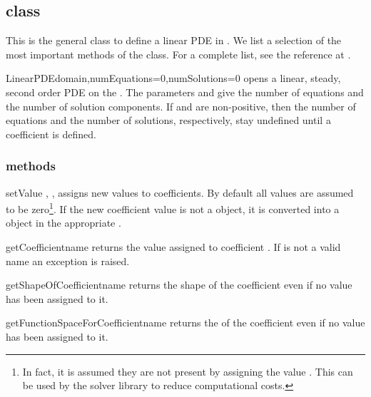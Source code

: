 \subsection{\LinearPDE class}
This is the general class to define a linear PDE in \escript.
We list a selection of the most important methods of the class.
For a complete list, see the reference at \ReferenceGuide.

\begin{classdesc}{LinearPDE}{domain,numEquations=0,numSolutions=0}
opens a linear, steady, second order PDE on the \Domain {}.
The parameters  and  give the number of
equations and the number of solution components.
If  and  are non-positive, then the number
of equations and the number of solutions, respectively, stay undefined until a
coefficient is defined.
\end{classdesc}

\subsubsection{\LinearPDE methods}
\begin{methoddesc}[LinearPDE]{setValue}{
,
, }
assigns new values to coefficients. By default all values are assumed to be
zero\footnote{In fact, it is assumed they are not present by assigning the
value . This can be used by the solver library to reduce
computational costs.}.
If the new coefficient value is not a \Data object, it is converted into a
\Data object in the appropriate \FunctionSpace.
\end{methoddesc}

\begin{methoddesc}[LinearPDE]{getCoefficient}{name}
returns the value assigned to coefficient . If  is not a
valid name an exception is raised.
\end{methoddesc}

\begin{methoddesc}[LinearPDE]{getShapeOfCoefficient}{name}
returns the shape of the coefficient  even if no value has been
assigned to it.
\end{methoddesc}

\begin{methoddesc}[LinearPDE]{getFunctionSpaceForCoefficient}{name}
returns the \FunctionSpace of the coefficient  even if no value has
been assigned to it.
\end{methoddesc}

